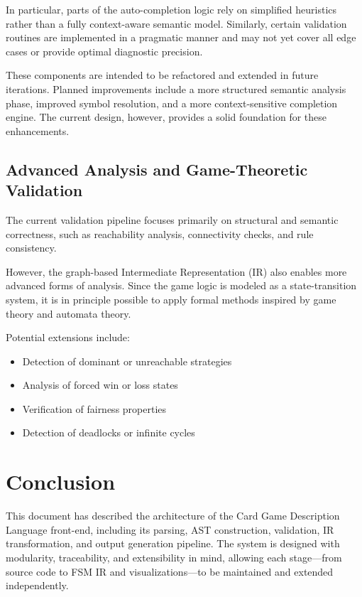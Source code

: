 \documentclass[a4paper,11pt]{article}
\begin{document}
In particular, parts of the auto-completion logic rely on simplified heuristics rather than a fully
context-aware semantic model. Similarly, certain validation routines are implemented in a pragmatic
manner and may not yet cover all edge cases or provide optimal diagnostic precision.

These components are intended to be refactored and extended in future iterations. Planned improvements
include a more structured semantic analysis phase, improved symbol resolution, and a more context-sensitive
completion engine. The current design, however, provides a solid foundation for these enhancements.

\subsection{Advanced Analysis and Game-Theoretic Validation}

The current validation pipeline focuses primarily on structural and semantic correctness,
such as reachability analysis, connectivity checks, and rule consistency.

However, the graph-based Intermediate Representation (IR) also enables more advanced forms
of analysis. Since the game logic is modeled as a state-transition system, it is in principle
possible to apply formal methods inspired by game theory and automata theory.

Potential extensions include:

\begin{itemize}
    \item Detection of dominant or unreachable strategies
    \item Analysis of forced win or loss states
    \item Verification of fairness properties
    \item Detection of deadlocks or infinite cycles
\end{itemize}

\section{Conclusion}

This document has described the architecture of the Card Game Description Language front-end, including its parsing, AST construction, validation, IR transformation, and output generation pipeline. The system is designed with modularity, traceability, and extensibility in mind, allowing each stage—from source code to FSM IR and visualizations—to be maintained and extended independently.
\end{document}
